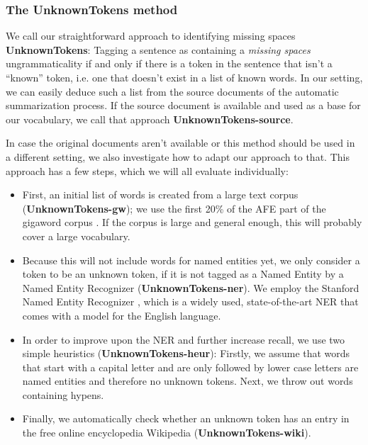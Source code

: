 \documentclass[a4paper,10pt]{scrartcl}
\theoremstyle{style}
\begin{document}
\subsubsection{The UnknownTokens method}
We call our straightforward approach to identifying missing spaces \textbf{UnknownTokens}: Tagging a sentence as containing a \textit{missing spaces} ungrammaticality if and only if there is a token in the sentence that isn't a ``known'' token, i.e. one that doesn't exist in a list of known words. In our setting, we can easily deduce such a list from the source documents of the automatic summarization process. If the source document is available and used as a base for our vocabulary, we call that approach \textbf{UnknownTokens-source}.

In case the original documents aren't available or this method should be used in a different setting, we also investigate how to adapt our approach to that. This approach has a few steps, which we will all evaluate individually:

\begin{itemize}
\item First, an initial list of words is created from a large text corpus (\textbf{UnknownTokens-gw}); we use the first 20\% of the AFE part of the gigaword corpus \citep{gigaword}. If the corpus is large and general enough, this will probably cover a large vocabulary.

\item Because this will not include words for named entities yet, we only consider a token to be an unknown token, if it is not tagged as a Named Entity by a Named Entity Recognizer (\textbf{UnknownTokens-ner}). We employ the Stanford Named Entity Recognizer \citep{stanfordNER}, which is a widely used, state-of-the-art NER that comes with a model for the English language.

\item In order to improve upon the NER and further increase recall, we use two simple heuristics (\textbf{UnknownTokens-heur}): Firstly, we assume that words that start with a capital letter and are only followed by lower case letters are named entities and therefore no unknown tokens. Next, we throw out words containing hypens. 

\item Finally, we automatically check whether an unknown token has an entry in the free online encyclopedia Wikipedia (\textbf{UnknownTokens-wiki}).

\end{itemize}
\end{document}
